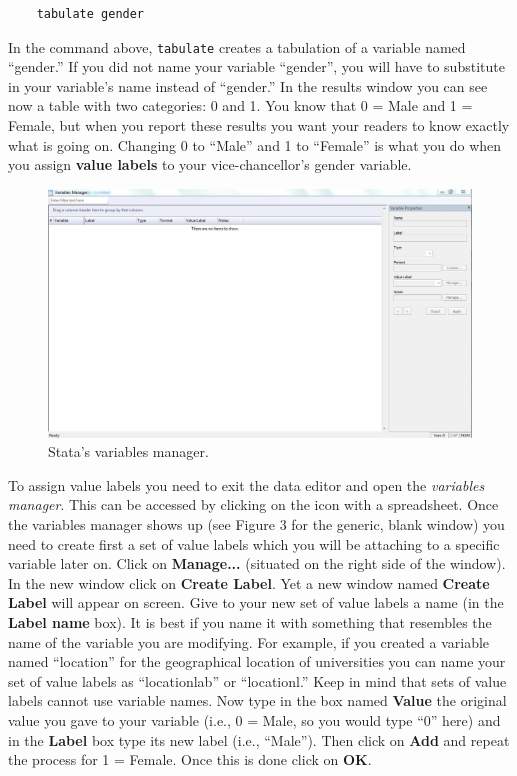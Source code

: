 \documentclass{article}
\begin{document}
\begin{lstlisting}
	tabulate gender
\end{lstlisting} 

In the command above, \texttt{tabulate} creates a tabulation of a variable named ``gender.'' If you did not name your variable ``gender'', you will have to substitute in your variable's name instead of ``gender.'' In the results window you can see now a table with two categories: 0 and 1. You know that 0 = Male and 1 = Female, but when you report these results you want your readers to know exactly what is going on. Changing 0 to ``Male'' and 1 to ``Female'' is what you do when you assign \textbf{value labels} to your vice-chancellor's gender variable.

\begin{figure}[H]
	\includegraphics[width=\linewidth]{Stata_Variables_Manager.JPG}
	\caption{Stata's variables manager.}
\end{figure}

To assign value labels you need to exit the data editor and open the \textit{variables manager}. This can be accessed by clicking on the icon with a spreadsheet. Once the variables manager shows up (see Figure 3 for the generic, blank window) you need to create first a set of value labels which you will be attaching to a specific variable later on. Click on \textbf{Manage...} (situated on the right side of the window). In the new window click on \textbf{Create Label}. Yet a new window named \textbf{Create Label} will appear on screen. Give to your new set of value labels a name (in the \textbf{Label name} box). It is best if you name it with something that resembles the name of the variable you are modifying. For example, if you created a variable named ``location'' for the geographical location of universities you can name your set of value labels as ``locationlab'' or ``locationl.'' Keep in mind that sets of value labels cannot use variable names. Now type in the box named \textbf{Value} the original value you gave to your variable (i.e., 0 = Male, so you would type ``0'' here) and in the \textbf{Label} box type its new label (i.e., ``Male''). Then click on \textbf{Add} and repeat the process for 1 = Female. Once this is done click on \textbf{OK}.
\end{document}
